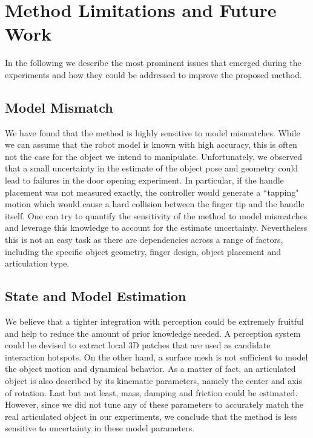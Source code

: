 
\section{Method Limitations and Future Work}\label{sec:limitations_and_future_works}
In the following we describe the most prominent issues that emerged during the experiments and how they could be addressed to improve the proposed method.

\subsection{Model Mismatch}
We have found that the method is highly sensitive to model mismatches. While we can assume that the robot model is known with high accuracy, this is often not the case for the object we intend to manipulate. Unfortunately, we observed that a small uncertainty in the estimate of the object pose and geometry could lead to failures in the door opening experiment. In particular, if the handle placement was not measured exactly, the controller would generate a ``tapping" motion which would cause a hard collision between the finger tip and the handle itself. One can try to quantify the sensitivity of the method to model mismatches and leverage this knowledge to account for the estimate uncertainty. Nevertheless this is not an easy task as there are dependencies across a range of factors, including the specific object geometry, finger design, object placement and articulation type. 

\subsection{State and Model Estimation}
We believe that a tighter integration with perception could be extremely fruitful and help to reduce the amount of prior knowledge needed. A perception system could be devised to extract local 3D patches that are used as candidate interaction hotspots. On the other hand, a surface mesh is not sufficient to model the object motion and dynamical behavior. As a matter of fact, an articulated object is also described by its kinematic parameters, namely the center and axis of rotation. Last but not least, mass, damping and friction could be estimated. However, since we did not tune any of these parameters to accurately match the real articulated object in our experiments, we conclude that the method is less sensitive to uncertainty in these model parameters.

